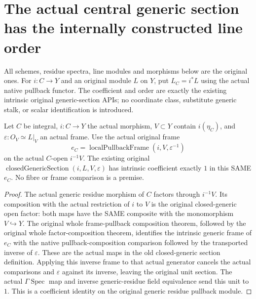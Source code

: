 \section{The actual central generic section has the internally constructed line order}

All schemes, residue spectra, line modules and morphisms below are the
original ones. For $i:C\to Y$ and an original module $L$ on $Y$, put
$L_C=i^*L$ using the actual native pullback functor. The coefficient and
order are exactly the existing intrinsic original generic-section APIs;
no coordinate class, substitute generic stalk, or scalar identification is
introduced.

\begin{lemma}
\label{lem:intrinsic-numerical-central-generator-original-coefficient}
\leanok
{}
Let $C$ be integral, $i:C\to Y$ the actual morphism, $V\subset Y$
contain $i(\eta_C)$, and $\varepsilon:O_V\simeq L|_V$ an actual frame.
Use the actual original frame
\[
 e_C=\operatorname{localPullbackFrame}(i,V,\varepsilon^{-1})
\]
on the actual $C$-open $i^{-1}V$. The existing original
$\operatorname{closedGenericSection}(i,L,V,\varepsilon)$ has intrinsic
coefficient exactly $1$ in this SAME $e_C$. No fibre or frame comparison
is a premise.
\end{lemma}
\begin{proof}
The actual generic residue morphism of $C$ factors through $i^{-1}V$.
Its composition with the actual restriction of $i$ to $V$ is the original
closed-generic open factor: both maps have the SAME composite with the
monomorphism $V\hookrightarrow Y$. The original whole frame-pullback
composition theorem, followed by the original whole factor-composition
theorem, identifies the intrinsic generic frame of $e_C$ with the native
pullback-composition comparison followed by the transported inverse of
$\varepsilon$. These are the actual maps in the old closed-generic section
definition. Applying this inverse frame to that actual generator cancels
the actual comparisons and $\varepsilon$ against its inverse, leaving
the original unit section. The actual $\Gamma\operatorname{Spec}$ map and
inverse generic-residue field equivalence send this unit to $1$. This is
a coefficient identity on the original generic residue pullback module.
\end{proof}

